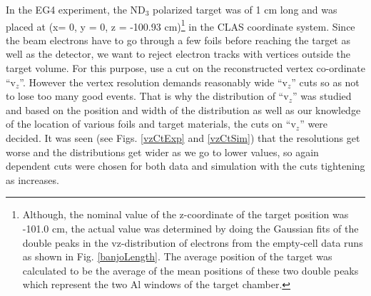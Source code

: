 In the EG4 experiment, the ND$_3$ polarized target was of 1 cm long and was placed at (x= 0, y = 0, z = -100.93 cm)\footnote{Although, the nominal value of 
  the z-coordinate of the target position was -101.0 cm, the actual value was determined by doing the Gaussian fits of the double peaks in the vz-distribution
  of electrons from the empty-cell data runs as shown in Fig. \ref{banjoLength}. The average position of the target was calculated to be the average of the mean
  positions of these two double peaks which represent the two Al windows of the target chamber.}
in the CLAS coordinate system. Since the beam electrons have to go through a few foils %
before reaching the target as well as the detector, we want to reject electron tracks with vertices 
outside the target volume. %
For this purpose, use a cut on the reconstructed vertex co-ordinate ``v$_z$''. %
However the vertex resolution demands reasonably %
wide ``v$_z$'' cuts so as not to lose too many %
good events. %
That is why the distribution of ``v$_z$'' was %
studied and based on the position and width of the distribution as well as our knowledge of the location of various foils and target materials, the cuts on ``v$_z$'' were decided. %
It was seen (see Figs. \ref{vzCtExp} and \ref{vzCtSim}) that the resolutions get worse and the distributions get wider as we go to lower \qsqs values, so again \qsqs dependent cuts were chosen for both data and simulation with the cuts tightening as \qsq increases.



